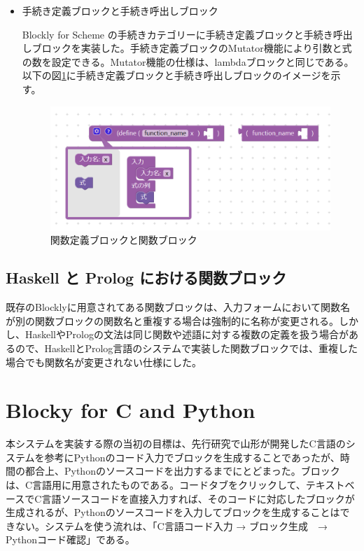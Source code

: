 \documentclass{risepaper}
\begin{document}
\begin{itemize}
\item 手続き定義ブロックと手続き呼出しブロック

Blockly for Scheme の手続きカテゴリーに手続き定義ブロックと手続き呼出しブロックを実装した。手続き定義ブロックのMutator機能により引数と式の数を設定できる。Mutator機能の仕様は、lambdaブロックと同じである。以下の図\ref{fig:scheme_func}に手続き定義ブロックと手続き呼出しブロックのイメージを示す。

\begin{figure}[h]
\begin{center}
\includegraphics[scale=0.5]{img/scheme_func.PNG}
\caption{関数定義ブロックと関数ブロック}%
\label{fig:scheme_func}
\end{center}%
\end{figure}%

\end{itemize} 

   \subsection{Haskell と Prolog における関数ブロック}
   
既存のBlocklyに用意されてある関数ブロックは、入力フォームにおいて関数名が別の関数ブロックの関数名と重複する場合は強制的に名称が変更される。しかし、HaskellやPrologの文法は同じ関数や述語に対する複数の定義を扱う場合があるので、HaskellとProlog言語のシステムで実装した関数ブロックでは、重複した場合でも関数名が変更されない仕様にした。

   \section{Blocky for C and Python}
   
本システムを実装する際の当初の目標は、先行研究で山形が開発したC言語のシステムを参考にPythonのコード入力でブロックを生成することであったが、時間の都合上、Pythonのソースコードを出力するまでにとどまった。ブロックは、C言語用に用意されたものである。コードタブをクリックして、テキストベースでC言語ソースコードを直接入力すれば、そのコードに対応したブロックが生成されるが、Pythonのソースコードを入力してブロックを生成することはできない。システムを使う流れは、「C言語コード入力 → ブロック生成　→ Pythonコード確認」である。
\end{document}
